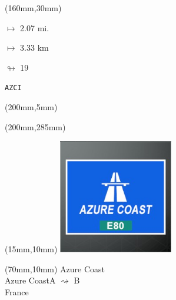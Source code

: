 \begin{textblock*}{40mm}(160mm,30mm)%
\Large
\par$\mapsto$ 2.07 mi.
\par$\mapsto$ 3.33 km
\par$\looparrowright$ 19
\par\hfill\tiny\tt AZCI\\
\end{textblock*}
\begin{textblock*}{20mm}(200mm,5mm)%
\fbox{\thepage}
\label{AZCI}
\end{textblock*}
\begin{textblock*}{20mm}(200mm,285mm)%
\fbox{\thepage}
\end{textblock*}

\null\newpage
\begin{textblock*}{50mm}(15mm,10mm)%
\includegraphics[width=50mm]{LG/2015-05-20_00073.png}
\end{textblock*}
\begin{textblock*}{130mm}(70mm,10mm)%
{\fontsize{20}{20}\selectfont Azure Coast\\}
{\fontsize{16}{16}\selectfont Azure Coast\hfill A $\rightsquigarrow$ B\\}
{\fontsize{12}{12}\selectfont France\\}
\end{textblock*}

